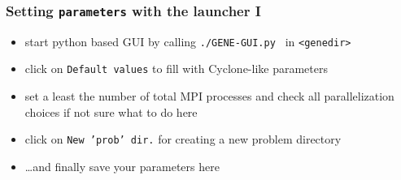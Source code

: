 \documentclass[10pt]{beamer}
\begin{document}
{
\begin{frame}[fragile]
  \frametitle{Setting {\tt parameters} with the launcher I}

\vspace{5.25cm}

\begin{block}{}
\begin{itemize}
\item start python based GUI by calling \verb|./GENE-GUI.py | in {\tt <genedir>}
\item click on {\tt Default values} to fill with Cyclone-like parameters
\item set a least the number of total MPI processes and check all parallelization choices if not sure what to do here
\item click on {\tt New 'prob' dir.} for creating a new problem directory
\item \ldots and finally save your parameters here
\end{itemize}
\end{block}

\end{frame}
}

\end{document}
